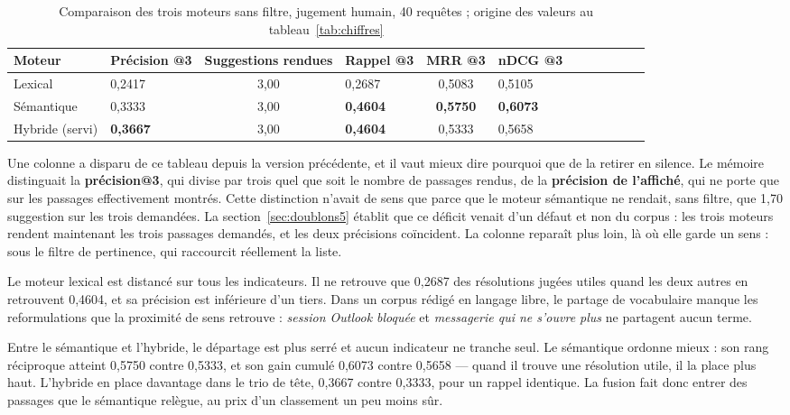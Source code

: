 \begin{table}[!htbp]
\centering
\styletableau
\caption[Comparaison des trois moteurs sans filtre, jugement humain,
40 requêtes]{Comparaison des trois moteurs sans filtre, jugement humain, 40 requêtes ;
origine des valeurs au tableau~\ref{tab:chiffres}}
\label{tab:moteurs5}
\begin{tabular}{|Bp{2.7cm}|Cp{1.7cm}|Cp{2.1cm}|Cp{1.7cm}|Cp{1.5cm}|Cp{1.6cm}|}
\hline
{}
\textbf{Moteur} & \textbf{Précision @3} & \textbf{Suggestions rendues} & \textbf{Rappel @3} &
\textbf{MRR @3} & \textbf{nDCG @3} \\
\hline
Lexical & 0,2417 & 3,00 & 0,2687 & 0,5083 & 0,5105 \\
\hline
Sémantique & 0,3333 & 3,00 & \textbf{0,4604} & \textbf{0,5750} & \textbf{0,6073} \\
\hline
Hybride (servi) & \textbf{0,3667} & 3,00 & \textbf{0,4604} & 0,5333 & 0,5658 \\
\hline
\end{tabular}
\end{table}

Une colonne a disparu de ce tableau depuis la version précédente, et il vaut mieux dire pourquoi
que de la retirer en silence. Le mémoire distinguait la \textbf{précision@3}, qui divise par trois
quel que soit le nombre de passages rendus, de la \textbf{précision de l'affiché}, qui ne porte que
sur les passages effectivement montrés. Cette distinction n'avait de sens que parce que le moteur
sémantique ne rendait, sans filtre, que 1,70 suggestion sur les trois demandées. La
section~\ref{sec:doublons5} établit que ce déficit venait d'un défaut et non du corpus : les trois
moteurs rendent maintenant les trois passages demandés, et les deux précisions coïncident. La
colonne reparaît plus loin, là où elle garde un sens : sous le filtre de pertinence, qui raccourcit
réellement la liste.

Le moteur lexical est distancé sur tous les indicateurs. Il ne retrouve que 0,2687 des résolutions
jugées utiles quand les deux autres en retrouvent 0,4604, et sa précision est inférieure d'un tiers.
Dans un corpus rédigé en langage libre, le partage de vocabulaire manque les reformulations que la
proximité de sens retrouve : \emph{session Outlook bloquée} et \emph{messagerie qui ne s'ouvre
plus} ne partagent aucun terme.

Entre le sémantique et l'hybride, le départage est plus serré et aucun indicateur ne tranche seul.
Le sémantique ordonne mieux : son rang réciproque atteint 0,5750 contre 0,5333, et son gain cumulé
0,6073 contre 0,5658 — quand il trouve une résolution utile, il la place plus haut. L'hybride en
place davantage dans le trio de tête, 0,3667 contre 0,3333, pour un rappel identique. La fusion
fait donc entrer des passages que le sémantique relègue, au prix d'un classement un peu moins sûr.

